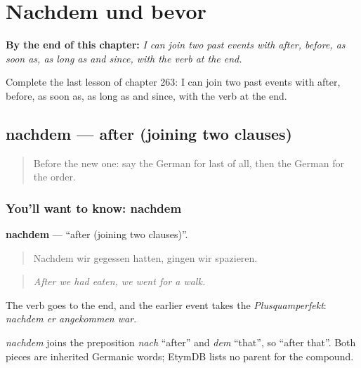 
\chapter{Nachdem und bevor}
\label{ch:ge-nachdem-und-bevor}

\begin{chapteropening}
\textbf{By the end of this chapter:} \emph{I can join two past events with after, before, as soon as, as long as and since, with the verb at the end.}

Complete the last lesson of chapter 263: I can join two past events with after, before, as soon as, as long as and since, with the verb at the end.
\end{chapteropening}

\section[nachdem]{nachdem — after (joining two clauses)}

\label{lesson:GE-C263-nachdem}



\begin{quote}
Before the new one: say the German for last of all, then the German for the order.
\end{quote}

\subsection*{You'll want to know: nachdem}
\textbf{nachdem} — \textquotedblleft{}after (joining two clauses)\textquotedblright{}.

\begin{quote}
Nachdem wir gegessen hatten, gingen wir spazieren.
\end{quote}

\begin{quote}
\emph{After we had eaten, we went for a walk.}
\end{quote}

The verb goes to the end, and the earlier event takes the \emph{Plusquamperfekt}: \emph{nachdem er angekommen war}.

\begin{cousinweb}
\emph{nachdem} joins the preposition \emph{nach} \textquotedblleft{}after\textquotedblright{} and \emph{dem} \textquotedblleft{}that\textquotedblright{}, so \textquotedblleft{}after that\textquotedblright{}. Both pieces are inherited Germanic words; EtymDB lists no parent for the compound.
\end{cousinweb}

